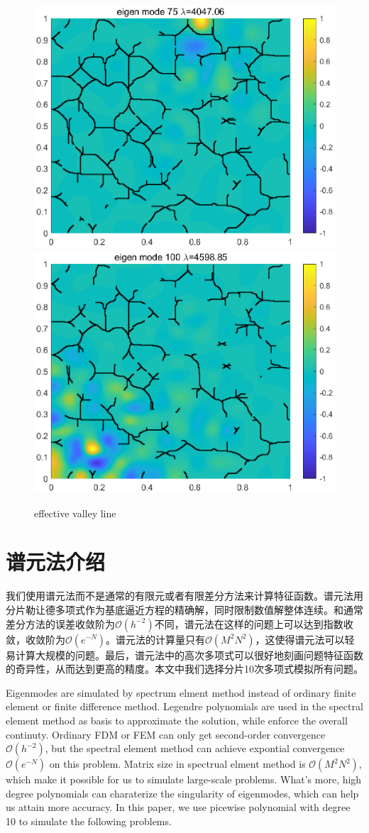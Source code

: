 \documentclass[12pt,a4paper]{article}
\begin{document}
\begin{figure}[htbp]
\includegraphics[width=0.3\linewidth]{pics/evl75}
\includegraphics[width=0.3\linewidth]{pics/evl100}
\caption{effective valley line}
\label{eVl}
\end{figure}

\section{谱元法介绍}

我们使用谱元法而不是通常的有限元或者有限差分方法来计算特征函数。谱元法用分片勒让德多项式作为基底逼近方程的精确解，同时限制数值解整体连续。和通常差分方法的误差收敛阶为$\mathcal{O}(h^{-2})$不同，谱元法在这样的问题上可以达到指数收敛，收敛阶为$\mathcal{O}(e^{-N})$。谱元法的计算量只有$\mathcal{O}(M^2 N^2)$，这使得谱元法可以轻易计算大规模的问题。最后，谱元法中的高次多项式可以很好地刻画问题特征函数的奇异性，从而达到更高的精度。本文中我们选择分片10次多项式模拟所有问题。

Eigenmodes are simulated by spectrum elment method instead of ordinary finite element or finite difference method. Legendre polynomials are used in the spectral element method as basis to approximate the solution, while enforce the overall continuty. Ordinary FDM or FEM can only get second-order convergence $\mathcal{O}(h^{-2})$, but the spectral element method can achieve expontial convergence $\mathcal{O}(e^{-N})$ on this problem. Matrix size in spectrual elment method is $\mathcal{O}(M^2 N^2)$, which make it possible for us to simulate large-scale problems. What's more, high degree polynomials can charaterize the singularity of eigenmodes, which can help us attain more accuracy. In this paper, we use picewise polynomial with degree 10 to simulate the following problems.
\end{document}
